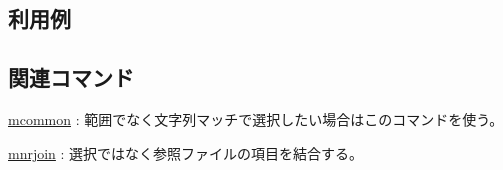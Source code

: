 
\subsection*{利用例}

\subsection*{関連コマンド}
\hyperref[sect:mcommon] {mcommon} : 範囲でなく文字列マッチで選択したい場合はこのコマンドを使う。

\hyperref[sect:mnrjoin] {mnrjoin} : 選択ではなく参照ファイルの項目を結合する。

%
